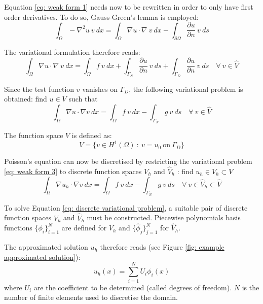 Equation \ref{eq: weak form 1} needs now to be rewritten in order to only have first order derivatives.
To do so, Gauss-Green's lemma is employed:
\begin{equation}
    \int_{\Omega} -\nabla^2 u \ v \ dx = \int_{\Omega} \nabla u \cdot \nabla \ v \ dx - \int_{\partial \Omega} \frac{\partial u}{\partial n} \ v \ ds
    \label{eq: gauss-green}
\end{equation}

The variational formulation therefore reads:
\begin{equation}
    \int_{\Omega} \nabla u \cdot \nabla \ v \ dx = \int_{\Omega} f \ v \ dx + \int_{\Gamma_N} \frac{\partial u}{\partial n} \ v \ ds + \int_{\Gamma_D} \frac{\partial u}{\partial n} \ v \ ds \quad \forall \ v \in \hat{V}
    \label{eq: weak form 2}
\end{equation}

Since the test function $v$ vanishes on $\Gamma_D$, the following variational problem is obtained: find $u \in V$ such that
\begin{equation}
    \int_{\Omega} \nabla u \cdot \nabla v  \ dx = \int_{\Omega} f \ v \ dx - \int_{\Gamma_N} g \ v \ ds \quad \forall \ v \in \hat{V}
    \label{eq: weak form 3}
\end{equation}

The function space $V$ is defined as:
\begin{equation}
    V = \{ v \in H^1(\Omega) \ : \ v=u_0 \ \text{on} \ \Gamma_D \}
\end{equation}

Poisson's equation can now be discretised by restricting the variational problem \ref{eq: weak form 3} to discrete function spaces $V_h$ and $\hat{V}_h$ : find $u_h \in V_h \subset V$
\begin{equation}
    \int_{\Omega} \nabla u_h \cdot \nabla v  \ dx = \int_{\Omega} f \ v \ dx - \int_{\Gamma_N} g \ v \ ds \quad \forall \ v \in \hat{V}_h \subset \hat{V}
    \label{eq: discrete variational problem}
\end{equation}

To solve Equation \ref{eq: discrete variational problem}, a suitable pair of discrete function spaces $V_h$ and $\hat{V}_h$ must be constructed.
Piecewise polynomials basis functions $\{ \phi_i \}_{i=1}^N$ are defined for $V_h$ and $\{ \hat{\phi}_j \}_{j=1}^N$ for $\hat{V}_h$.

The approximated solution $u_h$ therefore reads (see Figure \ref{fig: example approximated solution}):
\begin{equation}
    u_h(x) = \sum^N_{i=1}U_i \phi_i(x)
    \label{eq: FEM solution}
\end{equation}
where $U_i$ are the coefficient to be determined (called degrees of freedom).
$N$ is the number of finite elements used to discretise the domain.

